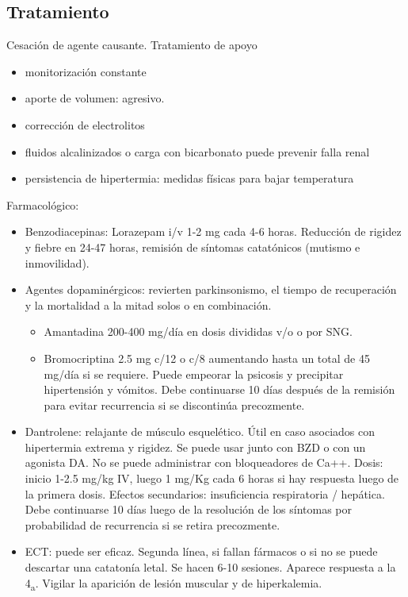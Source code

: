 \subsection*{Tratamiento}
Cesación de agente causante.
Tratamiento de apoyo
\begin{itemize}
	\item monitorización constante
	\item aporte de volumen: agresivo.
	\item corrección de electrolitos
	\item fluidos alcalinizados o carga con bicarbonato puede prevenir falla renal
	\item persistencia de hipertermia: medidas físicas para bajar temperatura
\end{itemize}
Farmacológico:
\begin{itemize}
	\item Benzodiacepinas: Lorazepam i/v 1-2 mg cada 4-6 horas. Reducción de rigidez y fiebre en 24-47 horas, remisión de síntomas catatónicos (mutismo e inmovilidad).
	\item Agentes dopaminérgicos: revierten parkinsonismo, \faArrowDown el tiempo de recuperación y \faArrowDown la mortalidad a la mitad solos o en combinación.
	\begin{itemize}
		\item Amantadina 200-400 mg/día en dosis divididas v/o o por SNG.
		\item Bromocriptina 2.5 mg c/12 o c/8 aumentando hasta un total de 45 mg/día si se requiere. Puede empeorar la psicosis y precipitar hipertensión y vómitos. Debe continuarse 10 días después de la remisión para evitar recurrencia si se discontinúa precozmente.
	\end{itemize}
	\item Dantrolene: relajante de músculo esquelético. Útil en caso asociados con hipertermia extrema y rigidez. Se puede usar junto con BZD o con un agonista DA. No se puede administrar con bloqueadores de Ca++. Dosis: inicio 1-2.5 mg/kg IV, luego 1 mg/Kg cada 6 horas si hay respuesta luego de la primera dosis. Efectos secundarios: insuficiencia respiratoria / hepática. Debe continuarse 10 días luego de la resolución de los síntomas por probabilidad de recurrencia si se retira precozmente.
	\item ECT: puede ser eficaz. Segunda línea, si fallan fármacos o si no se puede descartar una catatonía letal. Se hacen 6-10 sesiones. Aparece respuesta a la 4\textsubscript{a}. Vigilar la aparición de lesión muscular y de hiperkalemia.
\end{itemize}
